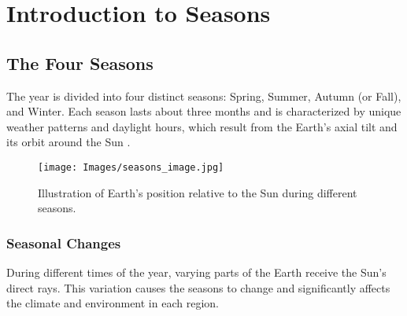 \chapter{Introduction to Seasons}

\section{The Four Seasons}

The year is divided into four distinct seasons: Spring, Summer, Autumn (or Fall), and Winter. Each season lasts about three months and is characterized by unique weather patterns and daylight hours, which result from the Earth's axial tilt and its orbit around the Sun \cite{SeasonsPlantLife}.

\begin{figure}[h]
	\centering
	\texttt{[image: Images/seasons\_image.jpg]}
	\caption{Illustration of Earth's position relative to the Sun during different seasons.}
	\label{fig:seasons}
\end{figure}

\subsection{Seasonal Changes}

During different times of the year, varying parts of the Earth receive the Sun's direct rays. This variation causes the seasons to change and significantly affects the climate and environment in each region.